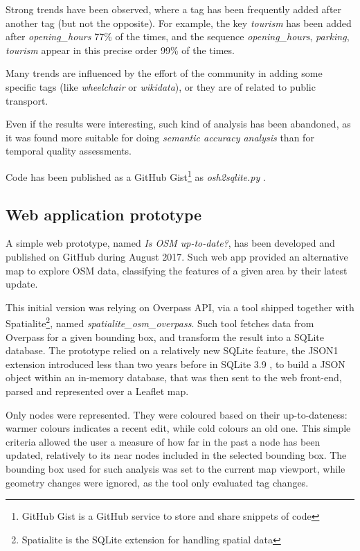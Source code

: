 \documentclass{Configuration_Files/PoliMi3i_thesis}
\begin{document}
Strong trends have been observed, where a tag has been frequently added after another tag (but not the opposite). For example, the key \textit{tourism} has been added after \textit{opening\_hours} 77\% of the times, and the sequence \textit{opening\_hours}, \textit{parking}, \textit{tourism} appear in this precise order 99\% of the times.

Many trends are influenced by the effort of the community in adding some specific tags (like \textit{wheelchair} or \textit{wikidata}), or they are of related to public transport.

Even if the results were interesting, such kind of analysis has been abandoned, as it was found more suitable for doing \textit{semantic accuracy analysis} than for temporal quality assessments.

Code has been published as a GitHub Gist\footnote{GitHub Gist is a GitHub service to store and share snippets of code} as \textit{osh2sqlite.py} \cite{262588213843476OSMNodeHistory}.

\subsection{Web application prototype}

A simple web prototype, named \textit{Is OSM up-to-date?}, has been developed and published on GitHub during August 2017. Such web app provided an alternative map to explore OSM data, classifying the features of a given area by their latest update.

This initial version was relying on Overpass API, via a tool shipped together with Spatialite\footnote{Spatialite is the SQLite extension for handling spatial data}, named \textit{spatialite\_osm\_overpass}. Such tool fetches data from Overpass for a given bounding box, and transform the result into a SQLite database. The prototype relied on a relatively new SQLite feature, the JSON1 extension introduced less than two years before in SQLite 3.9 \cite{SQLiteRelease20151014}, to build a JSON object within an in-memory database, that was then sent to the web front-end, parsed and represented over a Leaflet map.

Only nodes were represented. They were coloured based on their up-to-dateness: warmer colours indicates a recent edit, while cold colours an old one. This simple criteria allowed the user a measure of how far in the past a node has been updated, relatively to its near nodes included in the selected bounding box.
The bounding box used for such analysis was set to the current map viewport, while geometry changes were ignored, as the tool only evaluated tag changes.
\end{document}
